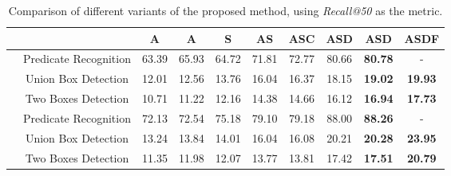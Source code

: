  \begin{table*}[t]
    \centering
    \small
\begin{tabular}{c|c|c|c|c|c|c|c|c|c}
	&  & A & A & S & AS & ASC & ASD & ASD &ASDF \\
	\hline
	\multirow{3}{*}{\rotatebox{90}{\textbf{VRD}}}
	& Predicate Recognition & 63.39 & 65.93 & 64.72 & 71.81 & 72.77 & 80.66 & \textbf{80.78} & -\\
	& Union Box Detection & 12.01 & 12.56 & 13.76 & 16.04 & 16.37 & 18.15 & \textbf{19.02} & \textbf{19.93} \\
	& Two Boxes Detection & 10.71 & 11.22 & 12.16 & 14.38 & 14.66 & 16.12 & \textbf{16.94} & \textbf{17.73} \\
	\hline
	\hline
	\multirow{3}{*}{\rotatebox{90}{\textbf{sVG}}}
	& Predicate Recognition & 72.13 & 72.54 & 75.18 & 79.10 & 79.18 & 88.00 & \textbf{88.26} & -\\
	& Union Box Detection & 13.24 & 13.84 & 14.01 & 16.04 & 16.08 & 20.21 & \textbf{20.28} & \textbf{23.95} \\
	& Two Boxes Detection & 11.35 & 11.98 & 12.07 & 13.77 & 13.81 & 17.42 & \textbf{17.51} & \textbf{20.79}
\end{tabular}
    \caption{\small Comparison of different variants of the proposed method, using \emph{Recall@50} as the metric.}
    \label{tab:cfg_rst}
\end{table*}

